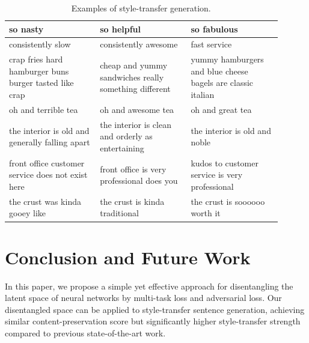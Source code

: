 \documentclass[11pt,a4paper]{article}
\begin{document}
\begin{table}[ht]
\begin{tabular}{| p{0.3\linewidth} | p{0.3\linewidth} | p{0.3\linewidth} |}
		\hline
		\hline
		so nasty                                               & so helpful                                                     & so fabulous                                                 \\
		\hline
		consistently slow                                      & consistently awesome                                           & fast service                                                \\
		\hline
		crap fries hard hamburger buns burger tasted like crap & cheap and yummy sandwiches really something different          & yummy hamburgers and blue cheese bagels are classic italian \\
		\hline
		oh and terrible tea                                    & oh and awesome tea                                             & oh and great tea                                            \\
		\hline
		the interior is old and generally falling apart        & the interior is clean and orderly as entertaining              & the interior is old and noble                               \\
		\hline
		front office customer service does not exist here      & front office is very professional does you                     & kudos to customer service is very professional              \\
		\hline
		the crust was kinda gooey like                         & the crust is kinda traditional                                 & the crust is soooooo worth it                               \\
		\hline
	\end{tabular}
	\caption{Examples of style-transfer generation.}
	\label{tab:transfer-samples}
\end{table}

\section{Conclusion and Future Work}
In this paper, we propose a simple yet effective approach for disentangling the latent space of neural networks by multi-task loss and adversarial loss. Our disentangled space can be applied to style-transfer sentence generation, achieving similar content-preservation score but significantly higher style-transfer strength compared to previous state-of-the-art work.



\end{document}
